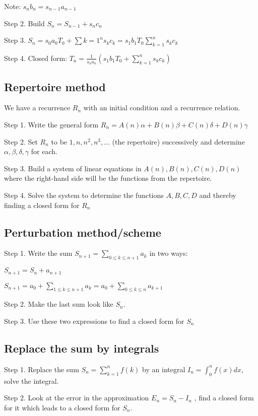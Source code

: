 \documentclass[10pt]{article}
\begin{document}
\begin{multicols}{3}
{Note: $s_n b_n = s_{n-1}a_{n-1}$

Step 2. Build $S_n = S_{n-1} + s_n c_n$

Step 3. $S_n = s_0 a_0 T_0 + \sum{k=1}^n s_k c_k = s_1b_1T_0 \sum_{k=1}^n s_k c_k$

Step 4. Closed form: $T_n = \frac{1}{s_n a_n}\left(s_1b_1T_0 + \sum_{k=1}^n s_k c_k\right)$
}

\subsection{Repertoire method}
{\everymath{\displaystyle}
We have a recurrence $R_n$ with an initial condition and a recurrence relation.

Step 1. Write the general form $R_n = A(n)\alpha + B(n) \beta + C(n) \delta + D(n) \gamma$

Step 2. Set $R_n$ to be $1,n,n^2,n^3,\dots$ (the repertoire) successively and determine $\alpha,\beta,\delta,\gamma$ for each.

Step 3. Build a system of linear equations in $A(n),B(n),C(n),D(n)$ where the right-hand side will be the functions from the repertoire. 

Step 4. Solve the system to determine the functions $A,B,C,D$ and thereby finding a closed form for $R_n$

}

\subsection{Perturbation method/scheme}
{\everymath{\displaystyle}

Step 1. Write the sum $S_{n+1} = \sum_{0\leq k \leq n+1} a_k $ in two ways:

$S_{n+1} = S_n + a_{n+1}$

$S_{n+1} = a_0 + \sum_{1\leq k \leq n+1} a_k = a_0 + \sum_{0\leq k \leq n} a_{k+1}$

Step 2. Make the last sum look like $S_n$.

Step 3. Use these two expressions to find a closed form for $S_n$

}

\subsection{Replace the sum by integrals}
{\everymath{\displaystyle}

Step 1. Replace the sum $S_n=\sum_{k=1}^n f(k)$ by an integral $I_n=\int_{0}^n f(x) dx$, solve the integral.

Step 2. Look at the error in the approximation $E_n = S_n - I_n$ , find a closed form for it which leads to a closed form for $S_n$. 
}

\newpage

\end{multicols}
\end{document}
